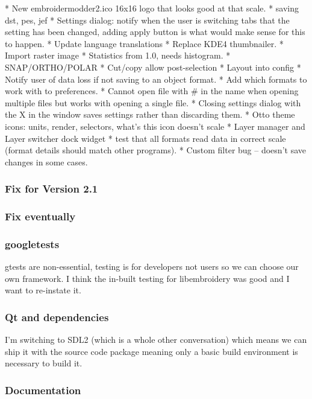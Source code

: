 \documentclass[11pt]{report}
\begin{document}
\begin{itemize}
* New embroidermodder2.ico 16x16 logo that looks good at that scale.
* saving dst, pes, jef
* Settings dialog: notify when the user is switching tabs that the setting has been changed, adding apply button is what would make sense for this to happen.
* Update language translations
* Replace KDE4 thumbnailer.
* Import raster image
* Statistics from 1.0, needs histogram.
* SNAP/ORTHO/POLAR
* Cut/copy allow post-selection
* Layout into config
* Notify user of data loss if not saving to an object format.
* Add which formats to work with to preferences.
* Cannot open file with \# in the name when opening multiple files but  works
  with opening a single file.
* Closing settings dialog with the X in the window saves settings rather than discarding them.
* Otto theme icons: units, render, selectors, what's this icon doesn't scale
* Layer manager and Layer switcher dock widget
*  test that all formats read data in correct scale (format details should match other programs).
* Custom filter bug -- doesn't save changes in some cases.
\end{itemize}

\subsubsection{Fix for Version 2.1}

\subsubsection{Fix eventually}

\subsubsection{googletests}

gtests are non-essential, testing is for developers not users so we can
choose our own framework. I think the in-built testing for libembroidery
was good and I want to re-instate it.

\subsubsection{Qt and dependencies}

I'm switching to SDL2 (which is a whole other conversation) which means
we can ship it with the source code package meaning only a basic build
environment is necessary to build it.

\subsubsection{Documentation}
\end{document}
